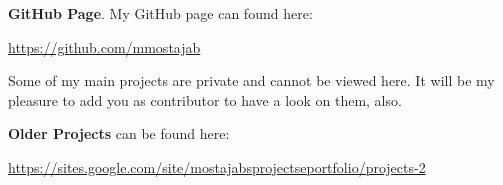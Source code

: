 \documentclass[]{report}
\begin{document}
\textbf{GitHub Page}. My GitHub page can found here:
 
\url{https://github.com/mmostajab}

Some of my main projects are private and cannot be viewed here. It will be my pleasure to add you as contributor to have a look on them, also.  
  
 
 \textbf{Older Projects} can be found here:
 
 \url{https://sites.google.com/site/mostajabsprojectseportfolio/projects-2}
 
 
\end{document}
